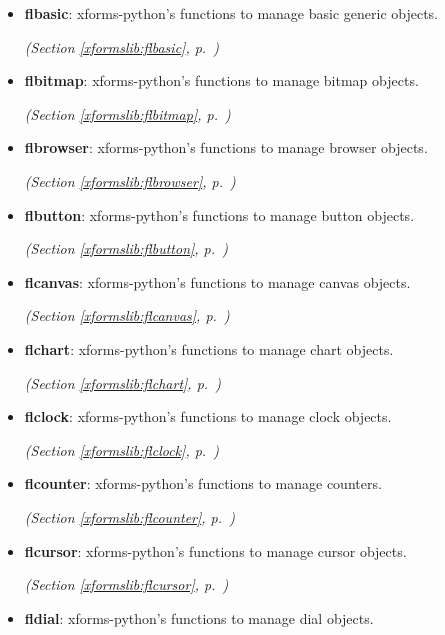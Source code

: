 \begin{itemize}
\setlength{\parskip}{0ex}
\item \textbf{flbasic}: 
xforms-python's functions to manage basic generic objects.


  \textit{(Section \ref{xformslib:flbasic}, p.~\pageref{xformslib:flbasic})}

\item \textbf{flbitmap}: 
xforms-python's functions to manage bitmap objects.


  \textit{(Section \ref{xformslib:flbitmap}, p.~\pageref{xformslib:flbitmap})}

\item \textbf{flbrowser}: 
xforms-python's functions to manage browser objects.


  \textit{(Section \ref{xformslib:flbrowser}, p.~\pageref{xformslib:flbrowser})}

\item \textbf{flbutton}: 
xforms-python's functions to manage button objects.


  \textit{(Section \ref{xformslib:flbutton}, p.~\pageref{xformslib:flbutton})}

\item \textbf{flcanvas}: 
xforms-python's functions to manage canvas objects.


  \textit{(Section \ref{xformslib:flcanvas}, p.~\pageref{xformslib:flcanvas})}

\item \textbf{flchart}: 
xforms-python's functions to manage chart objects.


  \textit{(Section \ref{xformslib:flchart}, p.~\pageref{xformslib:flchart})}

\item \textbf{flclock}: 
xforms-python's functions to manage clock objects.


  \textit{(Section \ref{xformslib:flclock}, p.~\pageref{xformslib:flclock})}

\item \textbf{flcounter}: 
xforms-python's functions to manage counters.


  \textit{(Section \ref{xformslib:flcounter}, p.~\pageref{xformslib:flcounter})}

\item \textbf{flcursor}: 
xforms-python's functions to manage cursor objects.


  \textit{(Section \ref{xformslib:flcursor}, p.~\pageref{xformslib:flcursor})}

\item \textbf{fldial}: 
xforms-python's functions to manage dial objects.



\end{itemize}

